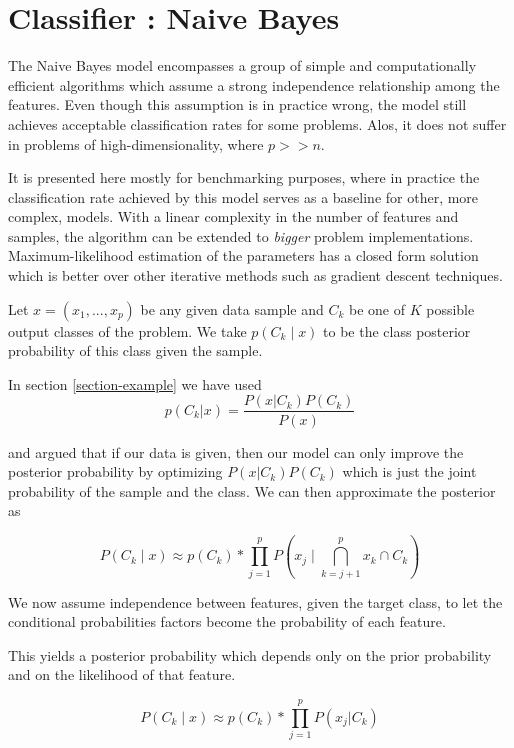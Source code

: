 \section{Classifier : Naive Bayes}

The Naive Bayes model encompasses a group of simple and computationally efficient algorithms which assume a strong independence relationship among the features. Even though this assumption is in practice wrong, the model still achieves acceptable classification rates for some problems. Alos, it does not suffer in problems of high-dimensionality, where $p >> n$.  

It is presented here mostly for benchmarking purposes, where in practice the classification rate achieved by this model serves as a baseline for other, more complex, models. With a linear complexity in the number of features and samples, the algorithm can be extended to \textit{bigger} problem implementations. Maximum-likelihood estimation of the parameters has a closed form solution which is better over other iterative methods such as gradient descent techniques.

Let $x = (x_1,...,x_p)$ be any given data sample and $C_k$ be one of $K$ possible output classes of the problem. We take $p(C_k \mid x)$  to be the  class posterior probability of this class given the sample. 

In section \ref{section-example}
we have used 
\[
p(C_k| x) = \frac{P(x|C_k)P(C_k)}{P(x)}
\]\label{equation-posteriorProbabilties}

and argued that if our data is given, then our model can only improve the posterior probability by optimizing $P(x|C_k)P(C_k)$ which is just the joint probability of the sample and the class. We can then approximate the posterior as

\[
P(C_k \mid x) \approx p(C_k) * \prod_{j=1}^{p}    P(x_j \mid \bigcap_{k=j+1}^{p} x_k \cap C_k)
\]\label{equation-posteriorProbabilityDecomposition1}

We now assume independence between features, given the target class, to let the conditional probabilities factors become the probability of each feature. %

This yields a posterior probability which depends only on the prior probability and on the likelihood of that feature.

\[
P(C_k \mid x) \approx p(C_k) * \prod_{j=1}^{p}    P(x_j | C_k)
\]\label{equation-posteriorProbabilityDecomposition2}

